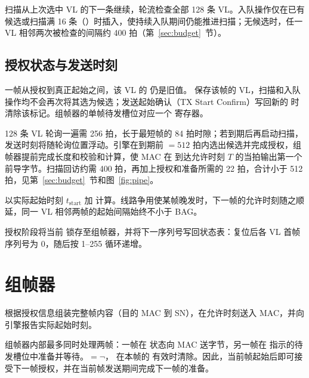 
扫描从上次选中 VL 的下一条继续，轮流检查全部 128 条 VL。入队操作仅在已有候选或扫描满 16 条（）时插入，使持续入队期间仍能推进扫描；无候选时，任一 VL 相邻两次被检查的间隔约 400 拍（第~\ref{sec:budget}~节）。

\subsection{授权状态与发送时刻}

一帧从授权到真正起始之间，该 VL 的  仍是旧值。 保存该帧的 VL，扫描和入队操作均不会再次将其选为候选；发送起始确认（TX Start Confirm）写回新的  时清除该标记。组帧器的单帧待发槽位对应一个  寄存器。

128 条 VL 轮询一遍需 256 拍，长于最短帧的 84 拍时隙；若到期后再启动扫描，发送时刻将随轮询位置浮动。引擎在到期前 $=512$ 拍内选出候选并完成授权，组帧器提前完成长度和校验和计算，使 MAC 在  到达允许时刻 $T$ 的当拍输出第一个前导字节。扫描回访约需 400 拍，再加上授权和准备所需的 22 拍，合计小于 512 拍，见第~\ref{sec:budget}~节和图~\ref{fig:pipe}。

 以实际起始时刻 $t_\text{start}$ 加  计算。线路争用使某帧晚发时，下一帧的允许时刻随之顺延，同一 VL 相邻两帧的起始间隔始终不小于 BAG。

授权阶段将当前  锁存至组帧器，并将下一序列号写回状态表：复位后各 VL 首帧序列号为 0，随后按 1--255 循环递增。

\section{组帧器}\label{sec:txbld}

 根据授权信息组装完整帧内容（目的 MAC 到 SN），在允许时刻送入 MAC，并向引擎报告实际起始时刻。

组帧器内部最多同时处理两帧：一帧在  状态向 MAC 送字节，另一帧在  指示的待发槽位中准备并等待。$=\neg$， 在本帧的  有效时清除。因此，当前帧起始后即可接受下一帧授权，并在当前帧发送期间完成下一帧的准备。

